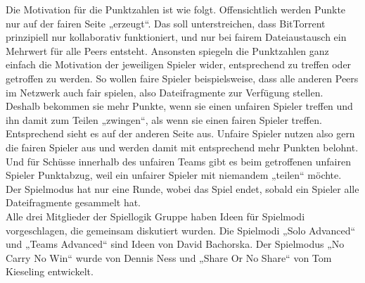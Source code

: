 Die Motivation für die Punktzahlen ist wie folgt. Offensichtlich werden Punkte nur auf der fairen Seite „erzeugt“. Das soll unterstreichen, dass BitTorrent prinzipiell nur kollaborativ funktioniert, und nur bei fairem Dateiaustausch ein Mehrwert für alle Peers entsteht. Ansonsten spiegeln die Punktzahlen ganz einfach die Motivation der jeweiligen Spieler wider, entsprechend zu treffen oder getroffen zu werden. So wollen faire Spieler beispielsweise, dass alle anderen Peers im Netzwerk auch fair spielen, also Dateifragmente zur Verfügung stellen. Deshalb bekommen sie mehr Punkte, wenn sie einen unfairen Spieler treffen und ihn damit zum Teilen „zwingen“, als wenn sie einen fairen Spieler treffen. Entsprechend sieht es auf der anderen Seite aus. Unfaire Spieler nutzen also gern die fairen Spieler aus und werden damit mit entsprechend mehr Punkten belohnt. Und für Schüsse innerhalb des unfairen Teams gibt es beim getroffenen unfairen Spieler Punktabzug, weil ein unfairer Spieler mit niemandem „teilen“ möchte. \\
Der Spielmodus hat nur eine Runde, wobei das Spiel endet, sobald ein Spieler alle Dateifragmente gesammelt hat. \\

\noindent
Alle drei Mitglieder der Spiellogik Gruppe haben Ideen für Spielmodi vorgeschlagen, die gemeinsam diskutiert wurden. Die Spielmodi „Solo Advanced“ und „Teams Advanced“ sind Ideen von David Bachorska. Der Spielmodus „No Carry No Win“ wurde von Dennis Ness und „Share Or No Share“ von Tom Kieseling entwickelt.
